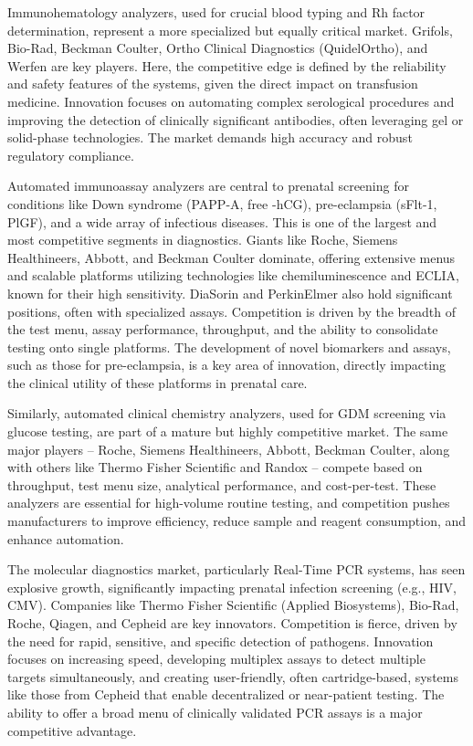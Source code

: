 \documentclass{article}
\begin{document}
Immunohematology analyzers, used for crucial blood typing and Rh factor determination, represent a more specialized but equally critical market. Grifols, Bio-Rad, Beckman Coulter, Ortho Clinical Diagnostics (QuidelOrtho), and Werfen are key players. Here, the competitive edge is defined by the reliability and safety features of the systems, given the direct impact on transfusion medicine. Innovation focuses on automating complex serological procedures and improving the detection of clinically significant antibodies, often leveraging gel or solid-phase technologies. The market demands high accuracy and robust regulatory compliance.

Automated immunoassay analyzers are central to prenatal screening for conditions like Down syndrome (PAPP-A, free \textbeta-hCG), pre-eclampsia (sFlt-1, PlGF), and a wide array of infectious diseases. This is one of the largest and most competitive segments in diagnostics. Giants like Roche, Siemens Healthineers, Abbott, and Beckman Coulter dominate, offering extensive menus and scalable platforms utilizing technologies like chemiluminescence and ECLIA, known for their high sensitivity. DiaSorin and PerkinElmer also hold significant positions, often with specialized assays. Competition is driven by the breadth of the test menu, assay performance, throughput, and the ability to consolidate testing onto single platforms. The development of novel biomarkers and assays, such as those for pre-eclampsia, is a key area of innovation, directly impacting the clinical utility of these platforms in prenatal care.

Similarly, automated clinical chemistry analyzers, used for GDM screening via glucose testing, are part of a mature but highly competitive market. The same major players – Roche, Siemens Healthineers, Abbott, Beckman Coulter, along with others like Thermo Fisher Scientific and Randox – compete based on throughput, test menu size, analytical performance, and cost-per-test. These analyzers are essential for high-volume routine testing, and competition pushes manufacturers to improve efficiency, reduce sample and reagent consumption, and enhance automation.

The molecular diagnostics market, particularly Real-Time PCR systems, has seen explosive growth, significantly impacting prenatal infection screening (e.g., HIV, CMV). Companies like Thermo Fisher Scientific (Applied Biosystems), Bio-Rad, Roche, Qiagen, and Cepheid are key innovators. Competition is fierce, driven by the need for rapid, sensitive, and specific detection of pathogens. Innovation focuses on increasing speed, developing multiplex assays to detect multiple targets simultaneously, and creating user-friendly, often cartridge-based, systems like those from Cepheid that enable decentralized or near-patient testing. The ability to offer a broad menu of clinically validated PCR assays is a major competitive advantage.
\end{document}
